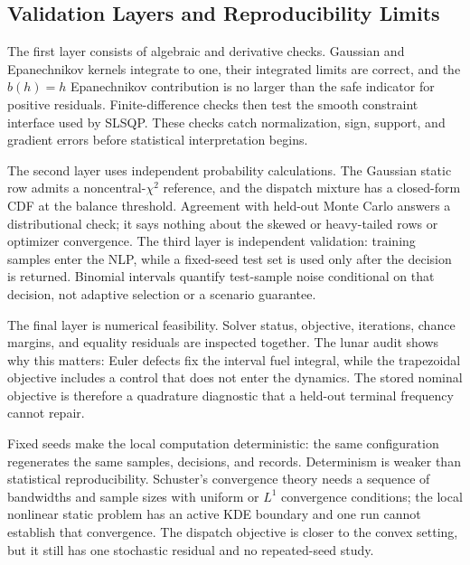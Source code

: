 \subsection{Validation Layers and Reproducibility Limits}
\label{sec:validation-layers}

The first layer consists of algebraic and derivative checks. Gaussian and Epanechnikov kernels integrate to one, their integrated limits are correct, and the $b(h)=h$ Epanechnikov contribution is no larger than the safe indicator for positive residuals. Finite-difference checks then test the smooth constraint interface used by SLSQP. These checks catch normalization, sign, support, and gradient errors before statistical interpretation begins.

The second layer uses independent probability calculations. The Gaussian static row admits a noncentral-$\chi^2$ reference, and the dispatch mixture has a closed-form CDF at the balance threshold. Agreement with held-out Monte Carlo answers a distributional check; it says nothing about the skewed or heavy-tailed rows or optimizer convergence. The third layer is independent validation: training samples enter the NLP, while a fixed-seed test set is used only after the decision is returned. Binomial intervals quantify test-sample noise conditional on that decision, not adaptive selection or a scenario guarantee.

The final layer is numerical feasibility. Solver status, objective, iterations, chance margins, and equality residuals are inspected together. The lunar audit shows why this matters: Euler defects fix the interval fuel integral, while the trapezoidal objective includes a control that does not enter the dynamics. The stored nominal objective is therefore a quadrature diagnostic that a held-out terminal frequency cannot repair.

Fixed seeds make the local computation deterministic: the same configuration regenerates the same samples, decisions, and records. Determinism is weaker than statistical reproducibility. Schuster's convergence theory needs a sequence of bandwidths and sample sizes with uniform or $L^1$ convergence conditions; the local nonlinear static problem has an active KDE boundary and one run cannot establish that convergence. The dispatch objective is closer to the convex setting, but it still has one stochastic residual and no repeated-seed study.
